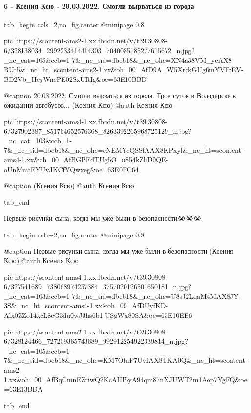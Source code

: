  
 
 
 
 

\paragraph{6 - Ксения Ксю - 20.03.2022. Смогли вырваться из города}



\ifcmt
  tab_begin cols=2,no_fig,center
     @minipage 0.8

     pic https://scontent-ams2-1.xx.fbcdn.net/v/t39.30808-6/328138034_2992233414414303_7040085185277615672_n.jpg?_nc_cat=105&ccb=1-7&_nc_sid=dbeb18&_nc_ohc=XN4a38VM_ycAX8-RUt5&_nc_ht=scontent-ams2-1.xx&oh=00_AfD9A_W5XrckGUg6mYVFrEV-BD2Vb_HeyWncPE02SxURIg&oe=63E10BBD

     @caption 20.03.2022. Смогли вырваться из города. Трое суток в Володарске в ожидании автобусов... (Ксения Ксю)
     @auth Ксения Ксю

     pic https://scontent-ams4-1.xx.fbcdn.net/v/t39.30808-6/327902387_851764652576368_8263392265968725129_n.jpg?_nc_cat=103&ccb=1-7&_nc_sid=dbeb18&_nc_ohc=eNEMYcQSSfAAX8KPxyl&_nc_ht=scontent-ams4-1.xx&oh=00_AfBGPEdTUg5O_u854kZliD9QE-oUnMmtEYUvJKCfYQwxeg&oe=63E0FC64

     @caption (Ксения Ксю)
     @auth Ксения Ксю

  tab_end
\fi


Первые рисунки сына, когда мы уже были в безопасности😭😭😭


\ifcmt
  tab_begin cols=2,no_fig,center
     @minipage 0.8

     @caption Первые рисунки сына, когда мы уже были в безопасности (Ксения Ксю)
     @auth Ксения Ксю

     pic https://scontent-ams4-1.xx.fbcdn.net/v/t39.30808-6/327541689_738068974257384_3757020126501650181_n.jpg?_nc_cat=103&ccb=1-7&_nc_sid=dbeb18&_nc_ohc=U8sJ2LqaM4MAX8JY-3S&_nc_ht=scontent-ams4-1.xx&oh=00_AfDUyfKD-Alx0ZZo14xcL8cG3du0wJ3hs6b1-USgWx80SA&oe=63E10EE6

     pic https://scontent-ams2-1.xx.fbcdn.net/v/t39.30808-6/328124466_727209365743689_992912254922339814_n.jpg?_nc_cat=105&ccb=1-7&_nc_sid=dbeb18&_nc_ohc=KM7OtaP7UvIAX8TKA0Q&_nc_ht=scontent-ams2-1.xx&oh=00_AfBqCmnEZriwQ2KcAIII5yA94qm87nXJUWT2m1Aop7YgFQ&oe=63E13BDA

  tab_end
\fi

